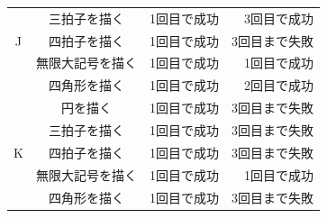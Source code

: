 \documentclass[12pt]{jreport}
\begin{document}
\begin{center}
\begin{longtable}{|c|c|r|r|}
                  & 三拍子を描く & 1回目で成功 & 3回目で成功 \\ \cline{2-4}
                J & 四拍子を描く & 1回目で成功 & 3回目まで失敗 \\ \cline{2-4}
                  & 無限大記号を描く & 1回目で成功 & 1回目で成功 \\ \cline{2-4}
                  & 四角形を描く & 1回目で成功 & 2回目で成功 \\ \hline %
                  & 円を描く & 1回目で成功 & 3回目まで失敗 \\ \cline{2-4}
                  & 三拍子を描く & 1回目で成功 & 3回目まで失敗 \\ \cline{2-4}
                K & 四拍子を描く & 1回目で成功 & 3回目まで失敗 \\ \cline{2-4}
                  & 無限大記号を描く & 1回目で成功 & 1回目で成功 \\ \cline{2-4}
                  & 四角形を描く & 1回目で成功 & 3回目まで失敗 \\ \hline
            \end{longtable}
        \end{center}
\end{document}
